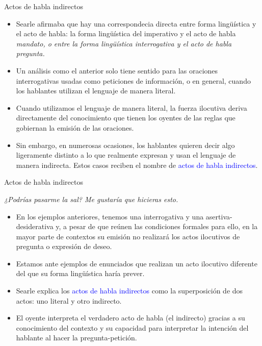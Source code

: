 \documentclass{beamer}
\begin{document}
\begin{frame}{Actos de habla indirectos}

	\begin{itemize}
		\item Searle afirmaba que hay una correspondecia directa entre forma lingüística y el acto de habla: la forma lingüística del imperativo y el acto de habla \it{mandato}, o entre la forma lingüística interrogativa y el acto de habla \it{pregunta}.
		\item Un análisis como el anterior solo tiene sentido para las oraciones interrogativas usadas como peticiones de información, o en general, cuando los hablantes utilizan el lenguaje de manera literal.
		\item Cuando utilizamos el lenguaje de manera literal, la fuerza ilocutiva deriva directamente del conocimiento que tienen los oyentes de las reglas que gobiernan la emisión de las oraciones. 
		\item Sin embargo, en numerosas ocasiones, los hablantes quieren decir algo ligeramente distinto a lo que realmente expresan y usan el lenguaje de manera indirecta. Estos casos reciben el nombre de \textcolor{blue}{actos de habla indirectos}.
	\end{itemize}

\end{frame}

\begin{frame}{Actos de habla indirectos}

		\it{¿Podrías pasarme la sal? Me gustaría que hicieras esto}.

	\vspace{0.3cm}
	
	\begin{itemize}
		\item En los ejemplos anteriores, tenemos una interrogativa y una asertiva-desiderativa y, a pesar de que reúnen las condiciones formales para ello, en la mayor parte de contextos su emisión no realizará los actos ilocutivos de pregunta o expresión de deseo.
		\item Estamos ante ejemplos de enunciados que realizan un acto ilocutivo diferente del que su forma lingüística haría prever.
		\item Searle explica los \textcolor{blue}{actos de habla indirectos} como la superposición de dos actos: uno literal y otro indirecto. 
		\item El oyente interpreta el verdadero acto de habla (el indirecto) gracias a su conocimiento del contexto y su capacidad para interpretar la intención del hablante al hacer la pregunta-petición.
	\end{itemize}

\end{frame}
\end{document}
